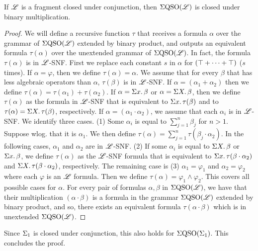 \begin{lemma} \label{conj-mult}
If $\mathscr{L}$ is a fragment closed under conjunction, then $\Sigma{\rm QSO}(\mathscr{L})$ is closed under binary multiplication.
\end{lemma}
\begin{proof}
We will define a recursive function $\tau$ that receives a formula $\alpha$ over the grammar of $\Sigma{\rm QSO}(\mathscr{L})$ extended by binary product, and outputs an equivalent formula $\tau(\alpha)$ over the unextended grammar of $\Sigma{\rm QSO}(\mathscr{L})$. In fact, the formula $\tau(\alpha)$ is in $\mathscr{L}$-SNF. First we replace each constant $s$ in $\alpha$ for $(\top + \cdots + \top)$ ($s$ times). If $\alpha = \varphi$, then we define $\tau(\alpha) = \alpha$. We assume that for every $\beta$ that has less algebraic operators than $\alpha$, $\tau(\beta)$ is in $\mathscr{L}$-SNF. If $\alpha = (\alpha_1 + \alpha_2)$ then we define $\tau(\alpha) = \tau(\alpha_1) + \tau(\alpha_2)$. If $\alpha = \Sigma{x}.\,\beta$ or $\alpha = \Sigma{X}.\,\beta$, then we define $\tau(\alpha)$ as the formula in $\mathscr{L}$-SNF that is equivalent to $\Sigma{x}.\,\tau(\beta)$ and to $\tau(\alpha) = \Sigma{X}.\,\tau(\beta)$, respectively. If $\alpha = (\alpha_1 \cdot \alpha_2)$, we assume that each $\alpha_i$ is in $\mathscr{L}$-SNF. We identify three cases. (1) Some $\alpha_i$ is equal to $\sum_{j = 1}^n\beta_j$ for $n > 1$. Suppose wlog. that it is $\alpha_1$. We then define $\tau(\alpha) = \sum_{j = 1}^n\tau(\beta_j\cdot\alpha_2)$. In the following cases, $\alpha_1$ and $\alpha_2$ are in $\mathscr{L}$-SNF. (2) If some $\alpha_i$ is equal to $\Sigma{X}.\,\beta$ or $\Sigma{x}.\,\beta$, we define $\tau(\alpha)$ as the $\mathscr{L}$-SNF formula that is equivalent to $\Sigma{x}.\,\tau(\beta\cdot\alpha_2)$ and $\Sigma{X}.\,\tau(\beta\cdot\alpha_2)$, respectively. The remaining case is (3) $\alpha_1 = \varphi_1$ and $\alpha_2 = \varphi_2$ where each $\varphi$ is an $\mathscr{L}$ formula. Then we define $\tau(\alpha) = \varphi_1 \wedge \varphi_2$. This covers all possible cases for $\alpha$. For every pair of formulas $\alpha,\beta$ in $\Sigma{\rm QSO}(\mathscr{L})$, we have that their multiplication $(\alpha\cdot\beta)$ is a formula in the grammar $\Sigma{\rm QSO}(\mathscr{L})$ extended by binary product, and so, there exists an equivalent formula $\tau(\alpha\cdot\beta)$ which is in unextended $\Sigma{\rm QSO}(\mathscr{L})$.
\end{proof}
Since $\Sigma_{1}$ is closed under conjunction, this also holds for $\Sigma{\rm QSO}(\Sigma_{1})$. This concludes the proof.











